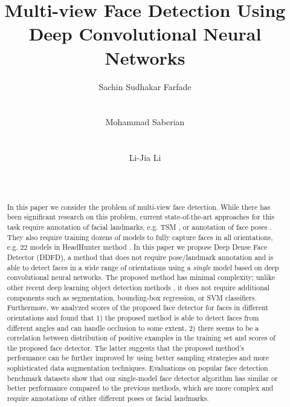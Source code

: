 \documentclass{sig-alternate-2013}
\begin{document}
\title{Multi-view Face Detection Using Deep Convolutional Neural Networks}


\author{
\alignauthor
Sachin Sudhakar Farfade\\
       \\
       \\ 
\alignauthor
Mohammad Saberian\\
       \\
       \\ 
\alignauthor 
Li-Jia Li\\
       \\
       \\ 
}

\maketitle
\begin{abstract} 
In this paper we consider the problem of multi-view face detection. While there has been significant research on this problem, current state-of-the-art approaches for this task require annotation of facial landmarks, e.g. TSM \cite{tsm}, or  annotation of face poses \cite{multires_cascade, head_hunter}. They also require training dozens of models to fully capture faces in all orientations, e.g. $22$ models in HeadHunter method \cite{head_hunter}. In this paper we propose Deep Dense Face  Detector (DDFD), a method that does not require pose/landmark annotation and is able to detect faces in a wide range of orientations using a \textit{single} model based on deep convolutional neural networks. The proposed method has minimal complexity; unlike other recent deep learning object detection methods \cite{rcnn}, it does not require additional components such as segmentation, bounding-box regression, or SVM classifiers. Furthermore, we analyzed scores of the proposed face detector for faces in different orientations and found that 1) the proposed method is able to detect faces from different angles and can handle occlusion to some extent, 2) there seems to be a correlation between distribution of positive examples in the training set and scores of the proposed face detector. The latter suggests that the proposed method's performance can be further improved by using better sampling strategies and more sophisticated data augmentation techniques.    Evaluations on popular face detection benchmark datasets show that our single-model face detector algorithm has similar or better performance compared to the previous methods, which are more complex and require  annotations of either different poses or facial landmarks.
\end{abstract}
\end{document}
